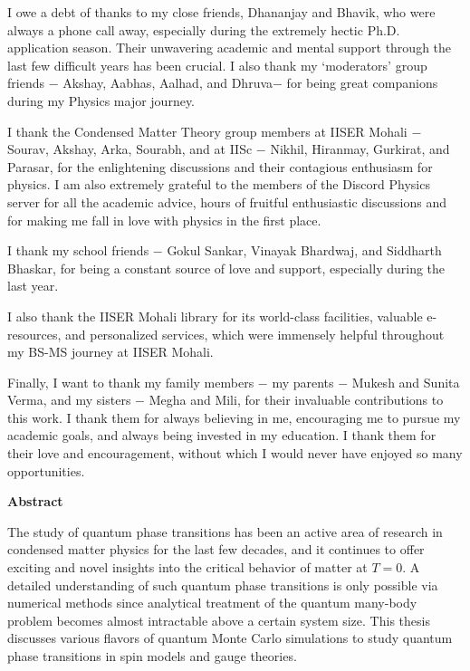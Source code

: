 \documentclass[a4paper,12pt]{report}
\numberwithin{equation}{section}
\begin{document}
I owe a debt of thanks to my close friends, Dhananjay and Bhavik, who were always a phone call away, especially during the extremely hectic Ph.D. application season. Their unwavering academic and mental support through the last few difficult years has been crucial. I also thank my `moderators' group friends $-$ Akshay, Aabhas, Aalhad, and Dhruva$-$ for being great companions during my Physics major journey.

I thank the Condensed Matter Theory group members at IISER Mohali $-$ Sourav, Akshay, Arka, Sourabh, and at IISc $-$ Nikhil, Hiranmay, Gurkirat, and Parasar, for the enlightening discussions and their contagious enthusiasm for physics. I am also extremely grateful to the members of the Discord Physics server for all the academic advice, hours of fruitful enthusiastic discussions and for making me fall in love with physics in the first place.

I thank my school friends $-$ Gokul Sankar, Vinayak Bhardwaj, and Siddharth Bhaskar, for being a constant source of love and support, especially during the last year.

I also thank the IISER Mohali library for its world-class facilities, valuable e-resources, and personalized services, which were immensely helpful throughout my BS-MS journey at IISER Mohali.

Finally, I want to thank my family members $-$ my parents $-$ Mukesh and Sunita Verma, and my sisters $-$ Megha and Mili, for their invaluable contributions to this work. I thank them for always believing in me, encouraging me to pursue my academic goals, and always being invested in my education. I thank them for their love and encouragement, without which I would never have enjoyed so many opportunities.

\newpage
\begin{center}
    \textsf{\textbf{\Large Abstract}} 
\end{center}
\vspace*{1em}

The study of quantum phase transitions has been an active area of research in condensed matter physics for the last few decades, and it continues to offer exciting and novel insights into the critical behavior of matter at $T=0$. A detailed understanding of such quantum phase transitions is only possible via numerical methods since analytical treatment of the quantum many-body problem becomes almost intractable above a certain system size. This thesis discusses various flavors of quantum Monte Carlo simulations to study quantum phase transitions in spin models and gauge theories. 
\end{document}
